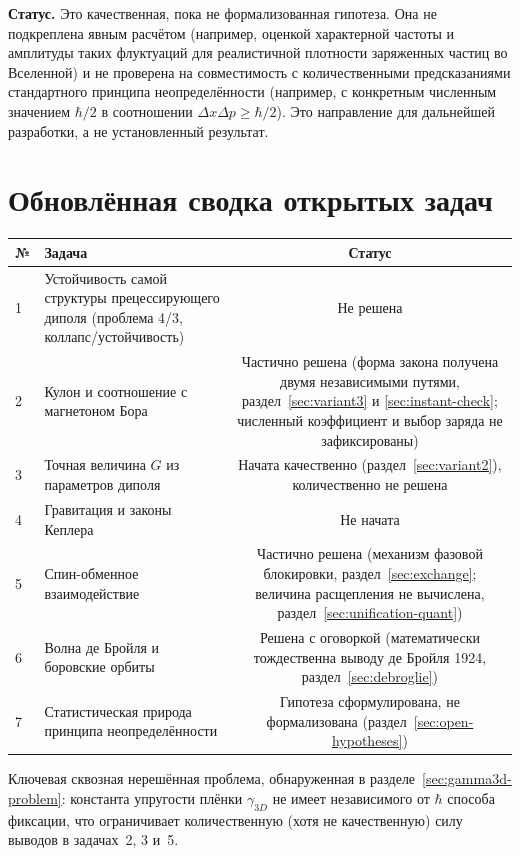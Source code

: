 \documentclass[12pt,a4paper]{article}
\begin{document}
\textbf{Статус.} Это качественная, пока не формализованная гипотеза.
Она не подкреплена явным расчётом (например, оценкой характерной частоты
и амплитуды таких флуктуаций для реалистичной плотности заряженных
частиц во Вселенной) и не проверена на совместимость с количественными
предсказаниями стандартного принципа неопределённости (например, с
конкретным численным значением $\hbar/2$ в соотношении
$\Delta x\Delta p\ge\hbar/2$). Это направление для дальнейшей разработки,
а не установленный результат.

\section{Обновлённая сводка открытых задач}
\label{sec:status-table}

\begin{center}
\begin{tabular}{|l|p{7cm}|c|}
\hline
№ & Задача & Статус \\
\hline
1 & Устойчивость самой структуры прецессирующего диполя (проблема 4/3, коллапс/устойчивость) & Не решена \\
2 & Кулон и соотношение с магнетоном Бора & Частично решена (форма закона получена двумя независимыми путями, раздел~\ref{sec:variant3} и \ref{sec:instant-check}; численный коэффициент и выбор заряда не зафиксированы) \\
3 & Точная величина $G$ из параметров диполя & Начата качественно (раздел~\ref{sec:variant2}), количественно не решена \\
4 & Гравитация и законы Кеплера & Не начата \\
5 & Спин-обменное взаимодействие & Частично решена (механизм фазовой блокировки, раздел~\ref{sec:exchange}; величина расщепления не вычислена, раздел~\ref{sec:unification-quant}) \\
6 & Волна де Бройля и боровские орбиты & Решена с оговоркой (математически тождественна выводу де Бройля 1924, раздел~\ref{sec:debroglie}) \\
7 & Статистическая природа принципа неопределённости & Гипотеза сформулирована, не формализована (раздел~\ref{sec:open-hypotheses}) \\
\hline
\end{tabular}
\end{center}

Ключевая сквозная нерешённая проблема, обнаруженная в
разделе~\ref{sec:gamma3d-problem}: константа упругости плёнки
$\gamma_{3D}$ не имеет независимого от $\hbar$ способа фиксации, что
ограничивает количественную (хотя не качественную) силу выводов в
задачах~2, 3 и~5.
\end{document}
